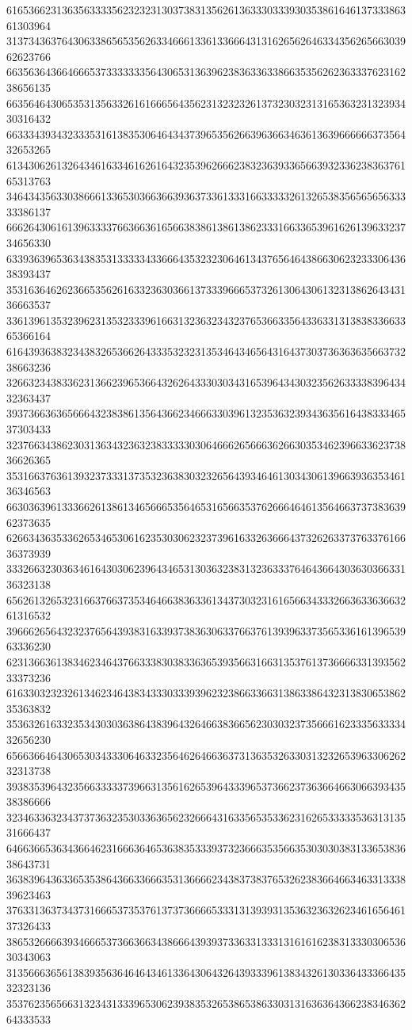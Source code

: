 61653662313635633335623232313037383135626136333033393035386164613733386361303964
31373436376430633865653562633466613361336664313162656264633435626566303962623766
66356364366466653733333335643065313639623836336338663535626236333762316238656135
66356464306535313563326161666564356231323232613732303231316536323132393430316432
66333439343233353161383530646434373965356266396366346361363966666637356432653265
61343062613264346163346162616432353962666238323639336566393233623836376165313763
34643435633038666133653036636639363733613331663333326132653835656565633333386137
66626430616139633337663663616566383861386138623331663365396162613963323734656330
63393639653634383531333334336664353232306461343765646438663062323330643638393437
35316364626236653562616332363036613733396665373261306430613231386264343136663537
33613961353239623135323339616631323632343237653663356433633131383833663365366164
61643936383234383265366264333532323135346434656431643730373636363566373238663236
32663234383362313662396536643262643330303431653964343032356263333839643432363437
39373663636566643238386135643662346663303961323536323934363561643833346537303433
32376634386230313634323632383333303064666265666362663035346239663362373836626365
35316637636139323733313735323638303232656439346461303430613966393635346136346563
66303639613336626138613465666535646531656635376266646461356466373738363962373635
62663436353362653465306162353030623237396163326366643732626337376337616636373939
33326632303634616430306239643465313036323831323633376464366430363036633136323138
65626132653231663766373534646638363361343730323161656634333266363363663261316532
39666265643232376564393831633937383630633766376139396337356533616139653963336230
62313663613834623464376633383038336365393566316631353761373666633139356233373236
61633032323261346234643834333033393962323866336631386338643231383065386235363832
35363261633235343030363864383964326466383665623030323735666162333563333432656230
65663664643065303433306463323564626466363731363532633031323265396330626232313738
39383539643235663333373966313561626539643339653736623736366466306639343538386666
32346336323437373632353033636562326664316335653533623162653333353631313531666437
64663665363436646231666364653638353339373236663535663530303038313365383638643731
36383964363365353864366336663531366662343837383765326238366466346331333839623463
37633136373437316665373537613737366665333131393931353632363262346165646137326433
38653266663934666537366366343866643939373363313331316161623831333030653630343063
31356663656138393563646464346133643064326439333961383432613033643336643532323136
35376235656631323431333965306239383532653865386330313163636436623834636264333533
